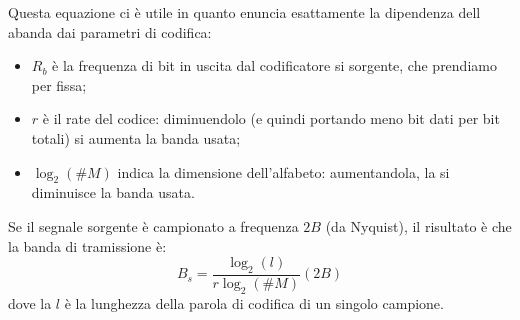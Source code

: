 \documentclass[a4paper,11pt]{article}
\begin{document}
Questa equazione ci è utile in quanto enuncia esattamente la dipendenza dell abanda dai parametri di codifica:
\begin{itemize}
	\item $R_b$ è la frequenza di bit in uscita dal codificatore si sorgente, che prendiamo per fissa; 
	\item $r$ è il rate del codice: diminuendolo (e quindi portando meno bit dati per bit totali) si aumenta la banda usata;
	\item $\log_2(\# M)$ indica la dimensione dell'alfabeto: aumentandola, la si diminuisce la banda usata.
\end{itemize}

Se il segnale sorgente è campionato a frequenza $2B$ (da Nyquist), il risultato è che la banda di tramissione è:
$$
B_s = \frac{\log_2 (l)}{r \log_2 (\#M)} (2B)
$$
dove la $l$ è la lunghezza della parola di codifica di un singolo campione.
\end{document}
